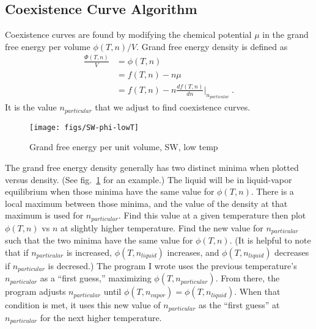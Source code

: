 \documentclass[letterpaper,twocolumn,amsmath,amssymb,prb]{revtex4-1}
\newcommand{\npart}{\ensuremath{n_{particular}}}
\newcommand{\nliq}{\ensuremath{n_{liquid}}}
\newcommand{\nvap}{\ensuremath{n_{vapor}}}
\newcommand{\1}{\ensuremath{\textbf{r}_1}}
\newcommand{\2}{\ensuremath{\textbf{r}_2}}
\newcommand{\3}{\ensuremath{\textbf{r}_3}}
\newcommand{\4}{\ensuremath{\textbf{r}_4}}
\begin{document}
\subsection{Coexistence Curve Algorithm}\label{subsec:coexis}
Coexistence curves are found by modifying the chemical potential $\mu$
in the grand free energy per volume $\phi(T,n)/V$. Grand free energy
density is defined as
\begin{align}
  \frac{\Phi(T,n)}{V} &= \phi(T,n) \nonumber \\
                 &= f(T,n) - n\mu \nonumber \\
                 &= f(T,n) - n\frac{df(T,n)}{dn}\bigg|_{\npart}\ .
\end{align}
It is the value $\npart$ that we adjust to find coexistence curves.

\begin{figure}
  \centering
  \texttt{[image: figs/SW-phi-lowT]}
  \caption{Grand free energy per unit volume, SW, low temp}
  \label{fig:SW-phi-lowT}
\end{figure}

The grand free energy density generally has two distinct minima when
plotted versus density. (See fig.~\ref{fig:SW-phi-lowT} for an example.) The liquid will be in liquid-vapor equilibrium
when those minima have the same value for $\phi(T,n)$. There is a local
maximum between those minima, and the value of the density at that
maximum is used for $\npart$. Find this value at a given temperature
then plot $\phi(T,n)$ vs $n$ at slightly higher temperature. Find the new
value for $\npart$ such that the two minima have the same value for
$\phi(T,n)$. (It is helpful to note that if $\npart$ is increased,
$\phi(T,\nliq)$ increases, and $\phi(T,\nliq)$ decreases if $\npart$ is
decresed.) The program I wrote uses the previous
temperature's $\npart$ as a ``first guess,'' maximizing
$\phi(T,\npart)$. From there, the program adjusts $\npart$
until $\phi(T,\nvap) = \phi(T,\nliq)$. When that condition is met, it
uses this new value of $\npart$ as the ``first guess'' at $\npart$ for the next
higher temperature.
\end{document}
